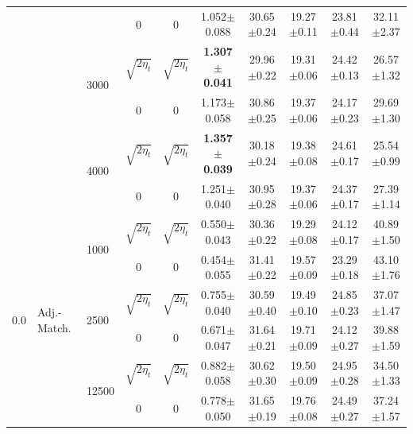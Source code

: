 \begin{table}[h!]
{\begin{tabular}{lllccccccc}
                                   & &  & 0                 & 0                 & 1.052{\tiny$\pm$0.088} & 30.65{\tiny$\pm$0.24} & 19.27{\tiny$\pm$0.11} & 23.81{\tiny$\pm$0.44} & 32.11{\tiny$\pm$2.37} \\
    \addlinespace
    & &  \multirow{2}{*}{3000}       & $\sqrt{2 \eta_t}$ & $\sqrt{2 \eta_t}$ & \textbf{1.307{\tiny$\pm$0.041}} & 29.96{\tiny$\pm$0.22} & 19.31{\tiny$\pm$0.06} & 24.42{\tiny$\pm$0.13} & 26.57{\tiny$\pm$1.32} \\
                                   & &  & 0                 & 0                 & 1.173{\tiny$\pm$0.058} & 30.86{\tiny$\pm$0.25} & 19.37{\tiny$\pm$0.06} & 24.17{\tiny$\pm$0.23} & 29.69{\tiny$\pm$1.30}
    \\
    \addlinespace
    & &  \multirow{2}{*}{4000}       & $\sqrt{2 \eta_t}$ & $\sqrt{2 \eta_t}$ & \textbf{1.357{\tiny$\pm$0.039}} & 30.18{\tiny$\pm$0.24} & 19.38{\tiny$\pm$0.08} & 24.61{\tiny$\pm$0.17} & 25.54{\tiny$\pm$0.99} \\
                                   & &  & 0                 & 0                 & 1.251{\tiny$\pm$0.040} & 30.95{\tiny$\pm$0.28} & 19.37{\tiny$\pm$0.06} & 24.37{\tiny$\pm$0.17} & 27.39{\tiny$\pm$1.14}
    \\
    \midrule
    \multirow{7}{*}{0.0} & \multirow{7}{*}{Adj.-Match.} & \multirow{2}{*}{1000} & $\sqrt{2 \eta_t}$ & $\sqrt{2 \eta_t}$  & 0.550{\tiny$\pm$0.043} & 30.36{\tiny$\pm$0.22} & 19.29{\tiny$\pm$0.08} & 24.12{\tiny$\pm$0.17} & 40.89{\tiny$\pm$1.50} \\
     & &  & 0                 & 0                 & 0.454{\tiny$\pm$0.055} &  31.41{\tiny$\pm$0.22} & 19.57{\tiny$\pm$0.09} & 23.29{\tiny$\pm$0.18} & 43.10{\tiny$\pm$1.76} \\
    \addlinespace
    & & \multirow{2}{*}{2500} & $\sqrt{2 \eta_t}$ & $\sqrt{2 \eta_t}$ & 0.755{\tiny$\pm$0.040} & 30.59{\tiny$\pm$0.40} & 19.49{\tiny$\pm$0.10} & 24.85{\tiny$\pm$0.23} & 37.07{\tiny$\pm$1.47} \\
    & &  & 0 & 0 & 0.671{\tiny$\pm$0.047} & 31.64{\tiny$\pm$0.21} & 19.71{\tiny$\pm$0.09} & 24.12{\tiny$\pm$0.27} & 39.88{\tiny$\pm$1.59} \\
    \addlinespace
    & & \multirow{2}{*}{12500} & $\sqrt{2 \eta_t}$ & $\sqrt{2 \eta_t}$ & 0.882{\tiny$\pm$0.058} & 30.62{\tiny$\pm$0.30} & 19.50{\tiny$\pm$0.09} & 24.95{\tiny$\pm$0.28} & 34.50{\tiny$\pm$1.33} \\
    & &  & 0 & 0 & 0.778{\tiny$\pm$0.050} & 31.65{\tiny$\pm$0.19} & 19.76{\tiny$\pm$0.08} & 24.49{\tiny$\pm$0.27} & 37.24{\tiny$\pm$1.57} \\

\end{tabular}}
\end{table}
